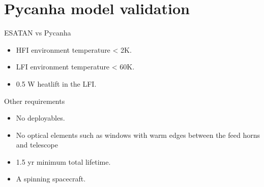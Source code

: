 \section{Pycanha model validation}

\begin{frame}{ESATAN vs Pycanha}


   \begin{itemize}
   \item HFI environment temperature < 2K.
   \item LFI environment temperature < 60K.
   \item 0.5 W heatlift in the LFI.
   \end{itemize}

\end{frame}

\begin{frame}{Other requirements}

   
\begin{itemize}
   \item No deployables.
   \item No optical elements such as windows with warm edges between the feed horns and telescope 
   \item 1.5 yr minimum total lifetime.
   \item A spinning spacecraft.
   \end{itemize}   
\end{frame}

